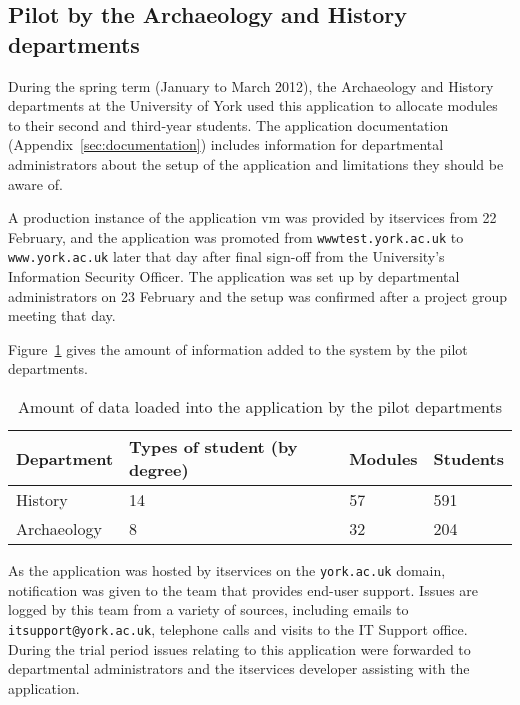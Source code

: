 
\subsection{Pilot by the Archaeology and History departments}

During the spring term (January to March 2012), the Archaeology and History
departments at the University of York used this application to allocate
modules to their second and third-year students. The application documentation
(Appendix~\ref{sec:documentation}) includes information for departmental
administrators about the setup of the application and limitations they should
be aware of.

A production instance of the application \gls{vm} was provided by
\gls{itservices} from 22 February, and the application was promoted from
\texttt{wwwtest.york.ac.uk} to \texttt{www.york.ac.uk} later that day after
final sign-off from the University's Information Security Officer. The
application was set up by departmental administrators on 23 February and the
setup was confirmed after a project group meeting that day.

Figure~\ref{development_pilot_department_numbers} gives the amount of
information added to the system by the pilot departments.

\begin{table}
  \begin{center}
    \begin{tabular}{ | l | l | l | l | }
      \hline
      \textbf{Department}  & \textbf{Types of student (by degree)} & \textbf{Modules} & \textbf{Students} \\
      \hline
      History     & 14                           & 57      & 591      \\
      Archaeology & 8                            & 32      & 204      \\
      \hline
    \end{tabular}
  \end{center}
  \caption{Amount of data loaded into the application by the pilot departments}
  \label{development_pilot_department_numbers}
\end{table}

As the application was hosted by \gls{itservices} on the \texttt{york.ac.uk}
domain, notification was given to the team that provides end-user support.
Issues are logged by this team from a variety of sources, including emails to
\texttt{itsupport@york.ac.uk}, telephone calls and visits to the IT Support
office. During the trial period issues relating to this application were
forwarded to departmental administrators and the \gls{itservices} developer
assisting with the application.

